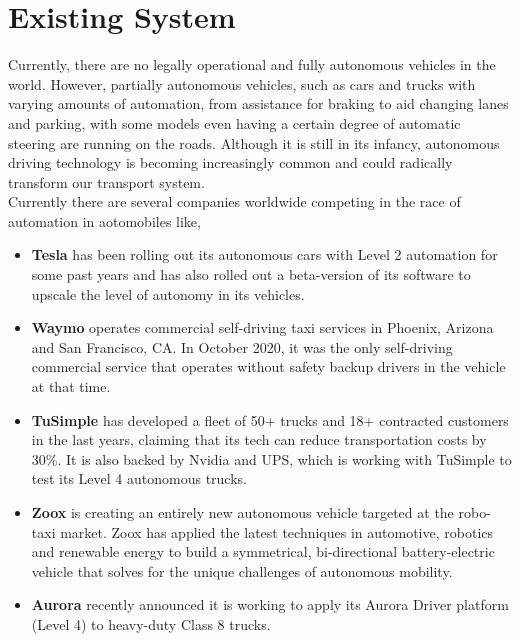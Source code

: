 \section{Existing System}
Currently, there are no legally operational and fully autonomous vehicles in the world. However, partially autonomous vehicles, such as cars and trucks with varying amounts of automation, from assistance for braking to aid changing lanes and parking, with some models even having a certain degree of automatic steering are running on the roads. Although it is still in its infancy, autonomous driving technology is becoming increasingly common and could radically transform our transport system.
\\
Currently there are several companies worldwide competing in the race of automation in aotomobiles like,
\begin{itemize}
    \item \textbf{Tesla} has been rolling out its autonomous cars with Level 2 automation for some past years and has also rolled out a beta-version of its software to upscale the level of autonomy in its vehicles.
    \item \textbf{Waymo} operates commercial self-driving taxi services in Phoenix, Arizona and San Francisco, CA. In October 2020, it was the only self-driving commercial service that operates without safety backup drivers in the vehicle at that time.
    \item \textbf{TuSimple} has developed a fleet of 50+ trucks and 18+ contracted customers in the last years, claiming that its tech can reduce transportation costs by 30\%. It is also backed by Nvidia and UPS, which is working with TuSimple to test its Level 4 autonomous trucks.
    \item \textbf{Zoox} is creating an entirely new autonomous vehicle targeted at the robo-taxi market. Zoox has applied the latest techniques in automotive, robotics and renewable energy to build a symmetrical, bi-directional battery-electric vehicle that solves for the unique challenges of autonomous mobility.
    \item \textbf{Aurora} recently announced it is working to apply its Aurora Driver platform (Level 4) to heavy-duty Class 8 trucks. 
\end{itemize}





